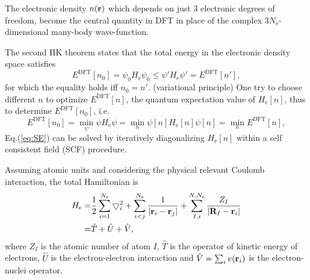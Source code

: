 The electronic density $n(\bf r)$ which depends on just 3 electronic degrees of freedom, become the central quantity in DFT 
in place of the complex $3N_{\text{e}}$-dimensional many-body wave-function.

The second HK theorem states that the total energy in the electronic density space satisfies
\begin{equation}
        E^{\text{DFT}}[n_0]= \psi_0  H_{\text{e}} \psi_0 \leq \psi' H_{\text{e}} \psi' =E^{\text{DFT}}[n'],
\label{eq:HK2}
\end{equation}
for which the equality holds iff $n_0=n'$. (variational principle)
One try to choose different $n$ to optimize $E^{\text{DFT}}[n]$, the quantum expectation value of $H_{\text{e}}[n]$, thus to determine $E^{\text{DFT}}[n_0]$, i.e.
\begin{equation}
E^{\text{DFT}}[n_0]= \min\limits_{\psi} \psi  H_{\text{e}} \psi  = \min\limits_{n}\psi[n]H_{\text{e}}[n]\psi[n] =\min\limits_{n}E^{\text{DFT}}[n],
\label{eq:var}
\end{equation}
Eq.\thinspace(\ref{eq:SE}) can be solved by iteratively diagonalizing $H_{\text{e}}[n]$ within a self consistent field (SCF) procedure.

Assuming atomic units and considering the physical relevant Coulomb interaction, the total Hamiltonian is 
\begin{align}        
        H_{\text{e}} =& \frac{1}{2}\sum_{i=1}^{N_{\text{e}}}\bigtriangledown_i^2 +\sum_{i<j}^{N_{\text{e}}}\frac{1}{|{\bf r}_i -{\bf r}_j|} +\sum_{I,i}^{N,N_{\text{e}}}\frac{Z_I}{|{\bf R}_I - {\bf r}_i|}   \nonumber \\
        =& {\hat{T}}+{\hat{U}}+{\hat{V}},
\label{eq:H}
\end{align}
where $Z_I$ is the atomic number of atom $I$, ${\hat{T}}$ is the operator of kinetic energy of electrons, ${\hat{U}}$ is the 
electron-electron interaction and  ${\hat{V}}=\sum_i v({\bf r}_i)$ is the electron-nuclei operator.

